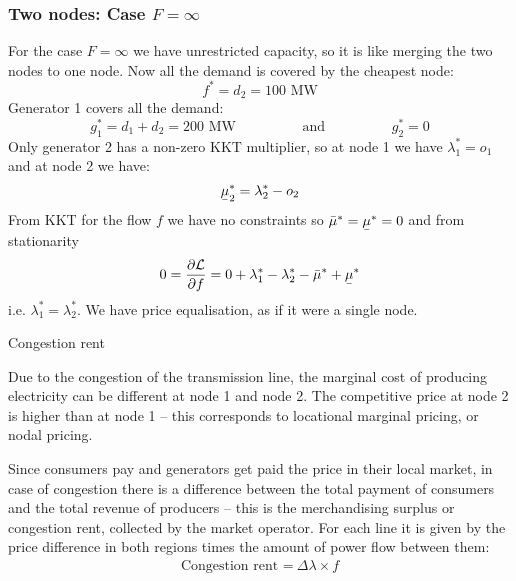 \documentclass[10pt,aspectratio=169,dvipsnames]{beamer}
\def\l{\lambda}
\def\m{\mu}
\def\d{\partial}
\def\cL{\mathcal{L}}
\newcommand{\ubar}[1]{\text{\b{$#1$}}}
\begin{document}
\begin{frame}[fragile]
  \frametitle{Two nodes: Case $F = \infty$ }

  For the case $F = \infty$ we have unrestricted capacity, so it is
  like merging the two nodes to one node. Now all the demand is
  covered by the cheapest node:
  \begin{equation*}
    f^* = d_2 = 100\textrm{ MW}
  \end{equation*}
  Generator 1 covers all the demand:
  \begin{equation*}
    g_1^* = d_1+d_2  = 200\textrm{ MW} \hspace{2cm} \textrm{and} \hspace{2cm} g_2^* = 0
  \end{equation*}
  Only generator 2 has a non-zero KKT multiplier, so at node 1 we have
  $\l_1^* =o_1$ and at node 2 we have:
  \begin{equation*}
   \ubar{\m}_2^* = \l_2^* - o_2
  \end{equation*}
  From KKT for the flow $f$ we have no constraints so $\bar{\m}^* = \ubar{\m}^* = 0$ and from stationarity
  \begin{equation*}
    0 = \frac{\d \cL}{\d f} = 0 +  \l_1^* - \l_2^*  -  \bar{\m}^* + \ubar{\m}^*
  \end{equation*}
  i.e. $\l_1^* = \l_2^*$. We have price equalisation, as if it were a single node.

\end{frame}


\begin{frame}{Congestion rent}

Due to the congestion of the transmission line, the marginal cost of producing electricity can be different at node 1 and node 2. The competitive price at node 2 is higher than at node 1 -- this corresponds to \alert{locational marginal pricing}, or \alert{nodal pricing}.

Since consumers pay and generators get paid the price in their local market, in case of congestion there is a difference between the total payment of consumers and the total revenue of producers -- this is the \alert{merchandising surplus} or \alert{congestion rent}, collected by the market operator. For each line it is given by the price difference in both regions times the amount of power flow between them:
\begin{align*}
\text{Congestion rent =}\:\Delta \lambda\times f
\end{align*}


\end{frame}
\end{document}

